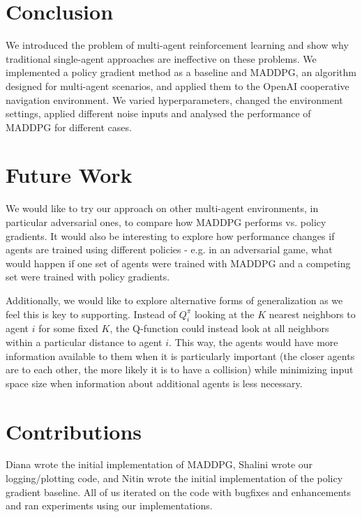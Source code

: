\documentclass{article}
\begin{document}
\section{Conclusion}
We introduced the problem of multi-agent reinforcement learning and show why traditional single-agent approaches are ineffective on these problems. We implemented a policy gradient method as a baseline and MADDPG, an algorithm designed for multi-agent scenarios, and applied them to the OpenAI cooperative navigation environment. We varied hyperparameters, changed the environment settings, applied different noise inputs and analysed the performance of MADDPG for different cases. 

\section{Future Work}
We would like to try our approach on other multi-agent environments, in particular adversarial ones, to compare how MADDPG performs vs. policy gradients. It would also be interesting to explore how performance changes if agents are trained using different policies - e.g. in an adversarial game, what would happen if one set of agents were trained with MADDPG and a competing set were trained with policy gradients.

Additionally, we would like to explore alternative forms of generalization as we feel this is key to supporting. Instead of $Q^\pi_i$ looking at the $K$ nearest neighbors to agent $i$ for some fixed $K$, the Q-function could instead look at all neighbors within a particular distance to agent $i$. This way, the agents would have more information available to them when it is particularly important (the closer agents are to each other, the more likely it is to have a collision) while minimizing input space size when information about additional agents is less necessary.

\section*{Contributions}
Diana wrote the initial implementation of MADDPG, Shalini wrote our logging/plotting code, and Nitin wrote the initial implementation of the policy gradient baseline. All of us iterated on the code with bugfixes and enhancements and ran experiments using our implementations.



\end{document}
